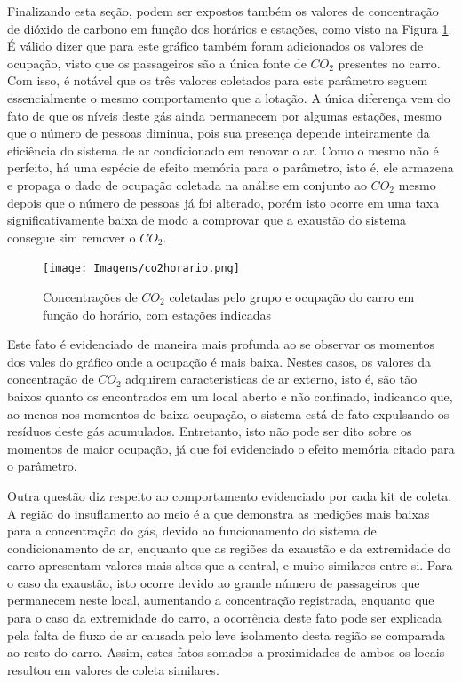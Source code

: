 \documentclass[acronym,symbols,table]{fei}
\begin{document}
Finalizando esta seção, podem ser expostos também os valores de concentração de dióxido de carbono em função dos horários e estações, como visto na Figura \ref{fig:co2horario}. É válido dizer que para este gráfico também foram adicionados os valores de ocupação, visto que os passageiros são a única fonte de ${CO}_{2}$ presentes no carro. Com isso, é notável que os três valores coletados para este parâmetro seguem essencialmente o mesmo comportamento que a lotação. A única diferença vem do fato de que os níveis deste gás ainda permanecem por algumas estações, mesmo que o número de pessoas diminua, pois sua presença depende inteiramente da eficiência do sistema de ar condicionado em renovar o ar. Como o mesmo não é perfeito, há uma espécie de efeito memória para o parâmetro, isto é, ele armazena e propaga o dado de ocupação coletada na análise em conjunto ao ${CO}_{2}$ mesmo depois que o número de pessoas já foi alterado, porém isto ocorre em uma taxa significativamente baixa de modo a comprovar que a exaustão do sistema consegue sim remover o ${CO}_{2}$.

\begin{figure}[!htb]
    \centering
    \caption{Concentrações de ${CO}_{2}$ coletadas pelo grupo e ocupação do carro em função do horário, com estações indicadas}
    \texttt{[image: Imagens/co2horario.png]}
    \label{fig:co2horario}
\end{figure}

Este fato é evidenciado de maneira mais profunda ao se observar os momentos dos vales do gráfico onde a ocupação é mais baixa. Nestes casos, os valores da concentração de ${CO}_{2}$ adquirem características de ar externo, isto é, são tão baixos quanto os encontrados em um local aberto e não confinado, indicando que, ao menos nos momentos de baixa ocupação, o sistema está de fato expulsando os resíduos deste gás acumulados. Entretanto, isto não pode ser dito sobre os momentos de maior ocupação, já que foi evidenciado o efeito memória citado para o parâmetro. 

Outra questão diz respeito ao comportamento evidenciado por cada kit de coleta. A região do insuflamento ao meio é a que demonstra as medições mais baixas para a concentração do gás, devido ao funcionamento do sistema de condicionamento de ar, enquanto que as regiões da exaustão e da extremidade do carro apresentam valores mais altos que a central, e muito similares entre si. Para o caso da exaustão, isto ocorre devido ao grande número de passageiros que permanecem neste local, aumentando a concentração registrada, enquanto que para o caso da extremidade do carro, a ocorrência deste fato pode ser explicada pela falta de fluxo de ar causada pelo leve isolamento desta região se comparada ao resto do carro. Assim, estes fatos somados a proximidades de ambos os locais resultou em valores de coleta similares.
\end{document}
